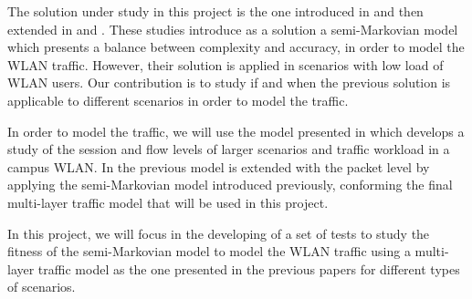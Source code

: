 The solution under study in this project is the one introduced in \cite{ActiveMeasure} and then extended in \cite{DSA-Emp} and \cite{CMA-Exp}. These studies introduce as a solution a semi-Markovian model which presents a balance between complexity and accuracy, in order to model the \acs{WLAN} traffic. However, their solution is applied in scenarios with low load of \acs{WLAN} users. Our contribution is to study if and when the previous solution is applicable to different scenarios in order to model the traffic.

In order to model the traffic, we will use the model presented in \cite{Campus-WLAN} which develops a study of the session and flow levels of larger scenarios and traffic workload in a campus \acs{WLAN}. In \cite{marcello} the previous model is extended with the packet level by applying the semi-Markovian model introduced previously, conforming the final multi-layer traffic model that will be used in this project.

In this project, we will focus in the developing of a set of tests to study the fitness of the semi-Markovian model to model the \acs{WLAN} traffic using a multi-layer traffic model as the one presented in the previous papers for different types of scenarios.